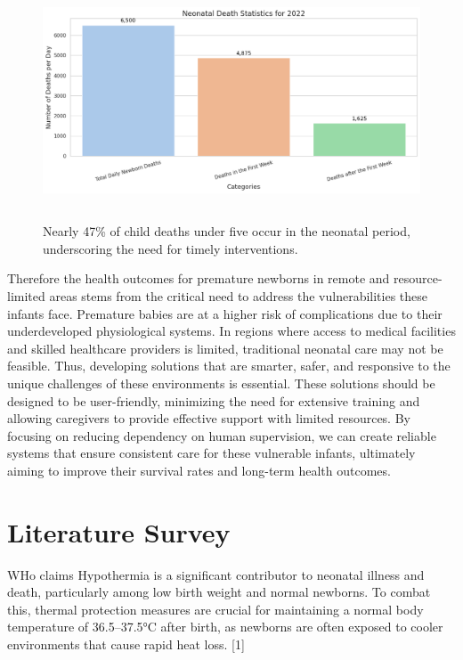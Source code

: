 \documentclass{article}
\begin{document}
\begin{figure}
  \centering
  \includegraphics[width=350pt,height=200pt]{images/clipboard-3806704517.png} %
  \caption{Nearly 47\% of child deaths under five occur in the neonatal period, underscoring the need for timely interventions.}
  \label{fig:fig2}
\end{figure}

Therefore the health outcomes for premature newborns in remote and
resource-limited areas stems from the critical need to address the
vulnerabilities these infants face. Premature babies are at a higher
risk of complications due to their underdeveloped physiological systems.
In regions where access to medical facilities and skilled healthcare
providers is limited, traditional neonatal care may not be feasible.
Thus, developing solutions that are smarter, safer, and responsive to
the unique challenges of these environments is essential. These
solutions should be designed to be user-friendly, minimizing the need
for extensive training and allowing caregivers to provide effective
support with limited resources. By focusing on reducing dependency on
human supervision, we can create reliable systems that ensure consistent
care for these vulnerable infants, ultimately aiming to improve their
survival rates and long-term health outcomes.

\section{Literature Survey}\label{literature-survey}

WHo claims Hypothermia is a significant contributor to neonatal illness
and death, particularly among low birth weight and normal newborns. To
combat this, thermal protection measures are crucial for maintaining a
normal body temperature of 36.5--37.5°C after birth, as newborns are
often exposed to cooler environments that cause rapid heat loss. {[}1{]}
\end{document}
